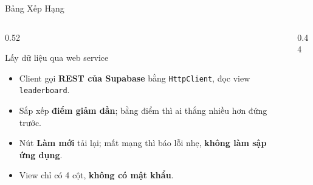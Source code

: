 \begin{frame}{Bảng Xếp Hạng}
  \begin{columns}[T]
    \begin{column}{0.52\textwidth}
      \begin{block}{Lấy dữ liệu qua web service}
        \begin{itemize}
          \item Client gọi \textbf{REST của Supabase} bằng \texttt{HttpClient}, đọc view \texttt{leaderboard}.
          \item Sắp xếp \textbf{điểm giảm dần}; bằng điểm thì ai thắng nhiều hơn đứng trước.
          \item Nút \textbf{Làm mới} tải lại; mất mạng thì báo lỗi nhẹ, \textbf{không làm sập ứng dụng}.
          \item View chỉ có 4 cột, \textbf{không có mật khẩu}.
        \end{itemize}
      \end{block}
    \end{column}
    \begin{column}{0.44\textwidth}
      \centering
    \end{column}
  \end{columns}
\end{frame}
